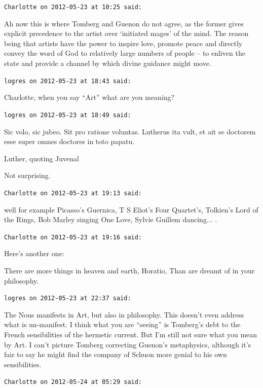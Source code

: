 \begin{footnotesize}
\begin{sffamily}
\texttt{Charlotte on 2012-05-23 at 10:25 said:}

Ah now this is where Tomberg and Guenon do not agree, as the former gives explicit precedence to the artist over `initiated mages' of the mind. The reason being that artists have the power to inspire love, promote peace and directly convey the word of God to relatively large numbers of people -- to enliven the state and provide a channel by which divine guidance might move.

\hfill

\texttt{logres on 2012-05-23 at 18:43 said:}

Charlotte, when you say ``Art'' what are you meaning?

\hfill

\texttt{logres on 2012-05-23 at 18:49 said:}

Sic volo, sic jubeo. Sit pro ratione voluntas. Lutherus ita vult, et ait se doctorem esse super omnes doctores in toto papatu.

Luther, quoting Juvenal

Not surprising.

\hfill

\texttt{Charlotte on 2012-05-23 at 19:13 said:}

well for example Picasso's Guernica, T S Eliot's Four Quartet's, Tolkien's Lord of the Rings, Bob Marley singing One Love, Sylvie Guillem dancing... .

\hfill

\texttt{Charlotte on 2012-05-23 at 19:16 said:}

Here's another one:

There are more things in heaven and earth, Horatio, Than are dreamt of in your philosophy.

\hfill

\texttt{logres on 2012-05-23 at 22:37 said:}

The Nous manifests in Art, but also in philosophy. This doesn't even address what is un-manifest. I think what you are ``seeing'' is Tomberg's debt to the French sensibilities of the hermetic current. But I'm still not sure what you mean by Art. I can't picture Tomberg correcting Guenon's metaphysics, although it's fair to say he might find the company of Schuon more genial to his own sensibilities.

\hfill

\texttt{Charlotte on 2012-05-24 at 05:29 said:}


\end{sffamily}
\end{footnotesize}

